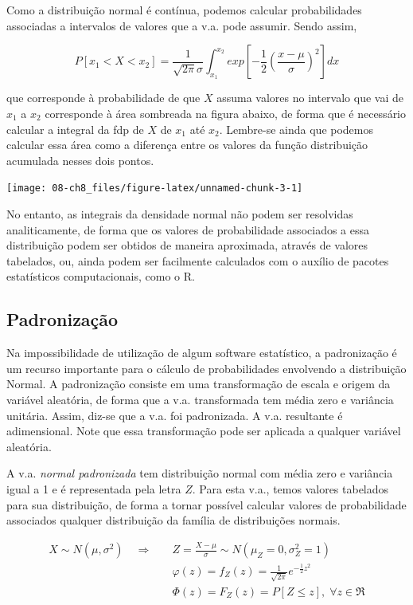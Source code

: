 \documentclass[
]{book}
\theoremstyle{definition}
\theoremstyle{definition}
\theoremstyle{definition}
\theoremstyle{remark}
\begin{document}
Como a distribuição normal é contínua, podemos calcular probabilidades associadas a intervalos de valores que a v.a. pode assumir. Sendo assim,

\[P[x_1 < X < x_2] = \frac{1}{\sqrt{2\pi}\sigma} \int_{x_1}^{x_2} exp\left[-\frac{1}{2}\left(\frac{x-\mu}{\sigma}\right)^2\right]dx\]

que corresponde à probabilidade de que \(X\) assuma valores no intervalo que vai de \(x_1\) a \(x_2\) corresponde à área sombreada na figura abaixo, de forma que é necessário calcular a integral da fdp de \(X\) de \(x_1\) até \(x_2\). Lembre-se ainda que podemos calcular essa área como a diferença entre os valores da função distribuição acumulada nesses dois pontos.

\begin{center}\texttt{[image: 08-ch8\_files/figure-latex/unnamed-chunk-3-1]} \end{center}

No entanto, as integrais da densidade normal não podem ser resolvidas analiticamente, de forma que os valores de probabilidade associados a essa distribuição podem ser obtidos de maneira aproximada, através de valores tabelados, ou, ainda podem ser facilmente calculados com o auxílio de pacotes estatísticos computacionais, como o R.

\hypertarget{padronizauxe7uxe3o-1}{%
\subsection*{Padronização}\label{padronizauxe7uxe3o-1}}

Na impossibilidade de utilização de algum software estatístico, a padronização é um recurso importante para o cálculo de probabilidades envolvendo a distribuição Normal. A padronização consiste em uma transformação de escala e origem da variável aleatória, de forma que a v.a. transformada tem média zero e variância unitária. Assim, diz-se que a v.a. foi padronizada. A v.a. resultante é adimensional. Note que essa transformação pode ser aplicada a qualquer variável aleatória.

A v.a. \emph{normal padronizada} tem distribuição normal com média zero e variância igual a 1 e é representada pela letra \(Z\). Para esta v.a., temos valores tabelados para sua distribuição, de forma a tornar possível calcular valores de probabilidade associados qualquer distribuição da família de distribuições normais.

\begin{align*}
  X \sim N(\mu, \sigma^2) \quad \Longrightarrow \quad 
  & Z = \frac{X - \mu}{\sigma} \sim N(\mu_Z = 0, \sigma_Z^2 = 1)\\
  & \varphi(z) = f_Z (z) = \frac{1}{\sqrt{2\pi}}e^{-\frac{1}{2}z^2}\\
  & \Phi(z) = F_Z(z) = P[Z \leq z], \; \forall z \in \Re
\end{align*}
\end{document}
